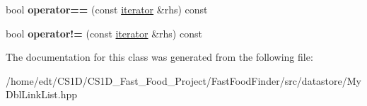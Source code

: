 \begin{DoxyCompactItemize}
\item 
\hypertarget{classnsMyDblLinkList_1_1MyDblLinkList_1_1iterator_aad5a50af3aa3a4eae80032c22c98d132}{bool {\bfseries operator==} (const \hyperlink{classnsMyDblLinkList_1_1MyDblLinkList_1_1iterator}{iterator} \&rhs) const }\label{classnsMyDblLinkList_1_1MyDblLinkList_1_1iterator_aad5a50af3aa3a4eae80032c22c98d132}

\item 
\hypertarget{classnsMyDblLinkList_1_1MyDblLinkList_1_1iterator_a9c00af89376665439bc6aba958f10b11}{bool {\bfseries operator!=} (const \hyperlink{classnsMyDblLinkList_1_1MyDblLinkList_1_1iterator}{iterator} \&rhs) const }\label{classnsMyDblLinkList_1_1MyDblLinkList_1_1iterator_a9c00af89376665439bc6aba958f10b11}

\end{DoxyCompactItemize}


The documentation for this class was generated from the following file\-:\begin{DoxyCompactItemize}
\item 
/home/edt/\-C\-S1\-D/\-C\-S1\-D\-\_\-\-Fast\-\_\-\-Food\-\_\-\-Project/\-Fast\-Food\-Finder/src/datastore/My\-Dbl\-Link\-List.\-hpp\end{DoxyCompactItemize}
